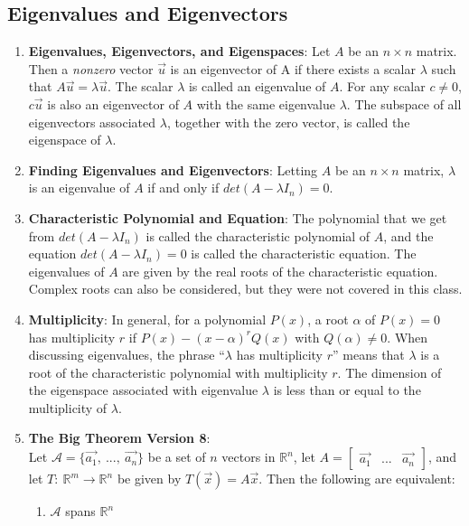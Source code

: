 \documentclass[10pt]{article}
\begin{document}
\subsection{Eigenvalues and Eigenvectors}
\begin{enumerate}
\item \textbf{Eigenvalues, Eigenvectors, and Eigenspaces}: Let $A$ be an $n \times n$ matrix. Then a \textit{nonzero} vector $\vec{u}$ is an eigenvector of A if there exists a scalar $\lambda$ such that $A\vec{u} = \lambda\vec{u}$. The scalar $\lambda$ is called an eigenvalue of $A$. For any scalar $c \neq 0$, $c\vec{u}$ is also an eigenvector of $A$ with the same eigenvalue $\lambda$. The subspace of all eigenvectors associated $\lambda$, together with the zero vector, is called the eigenspace of $\lambda$.
\item \textbf{Finding Eigenvalues and Eigenvectors}: Letting $A$ be an $n \times n$ matrix, $\lambda$ is an eigenvalue of $A$ if and only if $det(A - \lambda I_n) = 0$.
\item \textbf{Characteristic Polynomial and Equation}: The polynomial that we get from $det(A - \lambda I_n)$ is called the characteristic polynomial of $A$, and the equation $det(A - \lambda I_n) = 0$ is called the characteristic equation. The eigenvalues of $A$ are given by the real roots of the characteristic equation. Complex roots can also be considered, but they were not covered in this class. 
\item \textbf{Multiplicity}: In general, for a polynomial $P(x)$, a root $\alpha$ of $P(x) = 0$ has multiplicity $r$ if $P(x) - (x - \alpha)^rQ(x)$ with $Q(\alpha) \neq 0$. When discussing eigenvalues, the phrase ``$\lambda$ has multiplicity $r$'' means that $\lambda$ is a root of the characteristic polynomial with multiplicity $r$. The dimension of the eigenspace associated with eigenvalue $\lambda$ is less than or equal to the multiplicity of $\lambda$. 
\item \textbf{The Big Theorem Version 8}: \\
Let $\mathcal{A} = \lbrace \vec{a_1},\ ...,\ \vec{a_n} \rbrace$ be a set of $n$ vectors in $\mathbb{R}^n$, let $A = \begin{bmatrix}
\vec{a_1} & ... & \vec{a_n}
\end{bmatrix}$, and let $T:\ \mathbb{R}^m \rightarrow \mathbb{R}^n$ be given by $T(\vec{x}) = A\vec{x}$. Then the following are equivalent:
\begin{enumerate}
\item $\mathcal{A}$ spans $\mathbb{R}^n$

\end{enumerate}
\end{enumerate}
\end{document}
